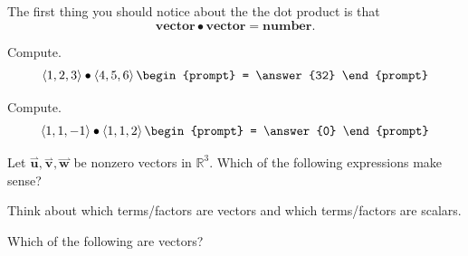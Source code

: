 \documentclass{ximera}
\begin{document}
The first thing you should notice about the the dot product is that
\[
\mathbf{vector}\bullet \mathbf{vector} = \mathbf{number}.
\]
\begin{question}
  Compute.
  \[
  \left\langle 1,2,3 \right\rangle \bullet \left\langle 4,5,6 \right\rangle
  \begin{prompt}
    = \answer{32}
  \end{prompt}
  \]
  \begin{question}
  Compute.
  \[
  \left\langle 1,1,-1 \right\rangle \bullet \left\langle 1,1,2 \right\rangle
  \begin{prompt}
    = \answer{0}
  \end{prompt}
  \]
\end{question}
\end{question}

\begin{question}
  Let $\overset{\boldsymbol{\rightharpoonup}}{\mathbf{u}},\overset{\boldsymbol{\rightharpoonup}}{\mathbf{v}},\overset{\boldsymbol{\rightharpoonup}}{\mathbf{w}}$ be nonzero vectors in $\mathbb{R}^3$. Which of
  the following expressions make sense?
  \begin{selectAll}
  \end{selectAll}
  \begin{hint}
    Think about which terms/factors are vectors and which
    terms/factors are scalars.
  \end{hint}
  \begin{question}
    Which of the following are vectors?

\end{question}
\end{question}
\end{document}
